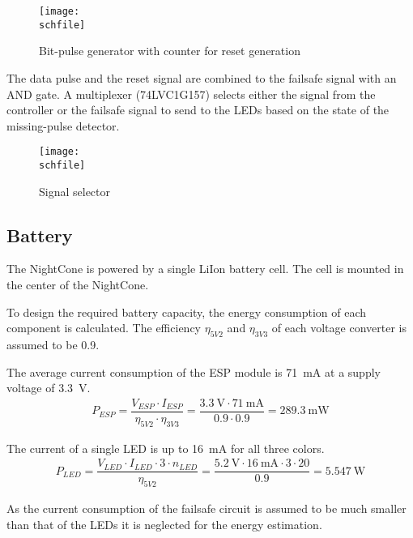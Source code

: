 \begin{figure}[h!]
    \centering
    \texttt{[image: \\schfile]}
    \caption{Bit-pulse generator with counter for reset generation}
    \label{fig_failsafe_bit_counter}
\end{figure}

The data pulse and the reset signal are combined to the failsafe signal with an AND gate. A multiplexer (74LVC1G157) selects either the signal from the controller or the failsafe signal to send to the \acp{LED} based on the state of the missing-pulse detector. 

\begin{figure}[h!]
    \centering
    \texttt{[image: \\schfile]}
    \caption{Signal selector}
    \label{fig_failsafe_mux}
\end{figure}

\FloatBarrier

\subsection{Battery}
\label{battery}
The NightCone is powered by a single \ac{LiIon} battery cell. The cell is mounted in the center of the NightCone. 

To design the required battery capacity, the energy consumption of each component is calculated. The efficiency $\eta_{5V2}$ and $\eta_{3V3}$ of each voltage converter is assumed to be 0.9. 

The average current consumption of the ESP module is \SI{71}{\milli\ampere} at a supply voltage of \SI{3.3}{\volt}. \cite{AIThinker:ESP_12F}
\begin{align}
    P_{ESP} = \dfrac{V_{ESP} \cdot I_{ESP}}{\eta_{5V2} \cdot \eta_{3V3}} = \dfrac{\SI{3.3}{\volt} \cdot \SI{71}{\milli\ampere}}{0.9 \cdot 0.9} = \SI{289.3}{\milli\watt}
\end{align}

The current of a single \ac{LED} is up to \SI{16}{\milli\ampere} for all three colors. \cite{Worldsemi:WS2813E}
\begin{align}
    P_{LED} = \dfrac{V_{LED} \cdot I_{LED} \cdot 3 \cdot n_{LED}}{\eta_{5V2}} = \dfrac{\SI{5.2}{\volt} \cdot \SI{16}{\milli\ampere} \cdot 3 \cdot 20}{0.9} = \SI{5.547}{\watt}
\end{align}

As the current consumption of the failsafe circuit is assumed to be much smaller than that of the \acp{LED} it is neglected for the energy estimation. 

